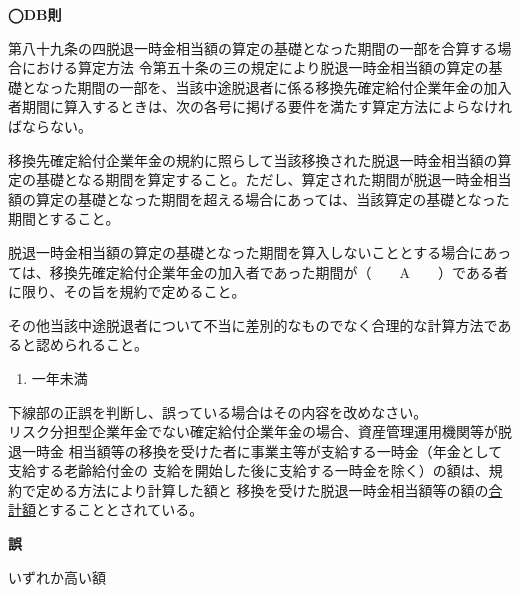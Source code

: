 \begin{fillblank}[年金1 2020 問題1(1)E]
  \noindent \textbf{◯DB則}
  \begin{lawstructure}
    \begin{lawarticle}{第八十九条の四}{脱退一時金相当額の算定の基礎となった期間の一部を合算する場合における算定方法}
      令第五十条の三の規定により脱退一時金相当額の算定の基礎となった期間の一部を、当該中途脱退者に係る移換先確定給付企業年金の加入者期間に算入するときは、次の各号に掲げる要件を満たす算定方法によらなければならない。

      移換先確定給付企業年金の規約に照らして当該移換された脱退一時金相当額の算定の基礎となる期間を算定すること。ただし、算定された期間が脱退一時金相当額の算定の基礎となった期間を超える場合にあっては、当該算定の基礎となった期間とすること。

      脱退一時金相当額の算定の基礎となった期間を算入しないこととする場合にあっては、移換先確定給付企業年金の加入者であった期間が（　　A　　）である者に限り、その旨を規約で定めること。

      その他当該中途脱退者について不当に差別的なものでなく合理的な計算方法であると認められること。
    \end{lawarticle}
  \end{lawstructure}
\end{fillblank}

\begin{answerbox}
  \begin{enumerate}[A: ]
    \item 一年未満
  \end{enumerate}
\end{answerbox}

\begin{truefalse}[年金1 2018 問題1(1)\textcircled{4}]
  下線部の正誤を判断し、誤っている場合はその内容を改めなさい。
  \\

  リスク分担型企業年金でない確定給付企業年金の場合、資産管理運用機関等が脱退一時金
相当額等の移換を受けた者に事業主等が支給する一時金（年金として支給する老齢給付金の
支給を開始した後に支給する一時金を除く）の額は、規約で定める方法により計算した額と
移換を受けた脱退一時金相当額等の額の\underline{合計額}とすることとされている。
\end{truefalse}

\begin{answerbox}
  \textbf{誤}

  いずれか高い額
\end{answerbox}

